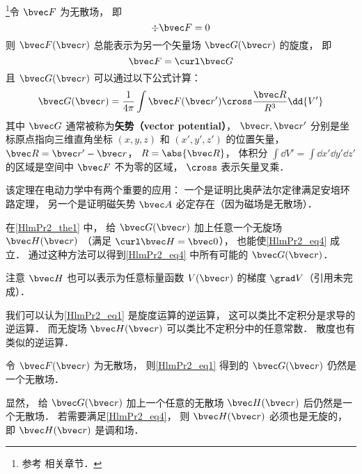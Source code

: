 
\begin{issues}
\issueTODO
\end{issues}


\begin{theorem}{}\label{HlmPr2_the1}
\footnote{参考 \cite{GriffE} 相关章节．}令 $\bvec F$ 为无散场， 即
\begin{equation}
\div \bvec F = 0
\end{equation}
则 $\bvec F(\bvec r)$ 总能表示为另一个矢量场 $\bvec G(\bvec r)$ 的旋度， 即
\begin{equation}\label{HlmPr2_eq4}
\bvec F = \curl \bvec G
\end{equation}
且 $\bvec G(\bvec r)$ 可以通过以下公式计算：
\begin{equation}\label{HlmPr2_eq1}
\bvec G(\bvec r) = \frac{1}{4\pi}\int \bvec F(\bvec r') \cross \frac{\bvec R}{R^3} \dd{V'}
\end{equation}
其中 $\bvec G$ 通常被称为\textbf{矢势（vector potential）}， $\bvec r, \bvec r'$ 分别是坐标原点指向三维直角坐标 $(x, y, z)$ 和 $(x', y', z')$ 的位置矢量， $\bvec R = \bvec r' - \bvec r$， $R = \abs{\bvec R}$， 体积分 $\int\dd{V'} = \int\dd{x'}\dd{y'}\dd{z'}$ 的区域是空间中 $\bvec F$ 不为零的区域， $\cross$ 表示矢量叉乘．
\end{theorem}

该定理在电动力学中有两个重要的应用： 一个是证明比奥萨法尔定律满足安培环路定理， 另一个是证明磁矢势 $\bvec A$ 必定存在（因为磁场是无散场）．

\begin{corollary}{}\label{HlmPr2_cor1}
在\autoref{HlmPr2_the1} 中， 给 $\bvec G(\bvec r)$ 加上任意一个无旋场 $\bvec H(\bvec r)$ （满足 $\curl \bvec H = \bvec 0$）， 也能使\autoref{HlmPr2_eq4} 成立． 通过这种方法可以得到\autoref{HlmPr2_eq4} 中所有可能的 $\bvec G(\bvec r)$．
\end{corollary}
注意 $\bvec H$ 也可以表示为任意标量函数 $V(\bvec r)$ 的梯度 $\grad V$（引用未完成）．

我们可以认为\autoref{HlmPr2_eq1} 是旋度运算的逆运算， 这可以类比不定积分是求导的逆运算． 而无旋场 $\bvec H(\bvec r)$ 可以类比不定积分中的任意常数． 散度也有类似的逆运算．

\begin{theorem}{}\label{HlmPr2_the2}
令 $\bvec F(\bvec r)$ 为无散场， 则\autoref{HlmPr2_eq1} 得到的 $\bvec G(\bvec r)$ 仍然是一个无散场．
\end{theorem}
显然， 给 $\bvec G(\bvec r)$ 加上一个任意的无散场 $\bvec H(\bvec r)$ 后仍然是一个无散场． 若需要满足\autoref{HlmPr2_eq4}， 则 $\bvec H(\bvec r)$ 必须也是无旋的， 即 $\bvec H(\bvec r)$ 是调和场．

